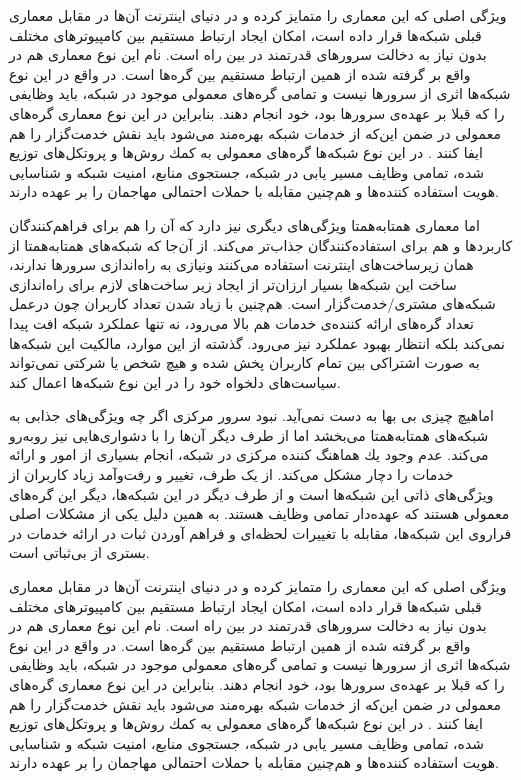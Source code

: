 \documentclass[12pt,twoside]{xepersian-magazine}
\begin{document}
\begin{article}{2}
ويژگی اصلی که اين معماری را متمايز کرده و در دنيای اينترنت آن‌ها در مقابل معماری قبلی شبكه‌ها قرار داده است، امكان ايجاد ارتباط مستقيم  بين كامپيوترهای مختلف بدون نياز به دخالت سرورهای قدرتمند در بين راه است.  نام‌ اين نوع معماری هم در واقع بر گرفته شده از همین  ارتباط مستقیم بين گره‌ها است.  در واقع در اين نوع شبكه‌ها اثری از سرورها نيست و تمامی گره‌های معمولی موجود در شبكه، بايد وظايفی را که قبلا بر عهده‌ی سرورها بود، خود انجام دهند. بنابراين در اين نوع معماری گره‌های معمولی در ضمن اين‌که از خدمات شبکه بهره‌مند می‌شود بايد نقش خدمت‌گزار را هم ايفا کنند . در اين نوع شبکه‌ها گره‌های معمولی به كمك روش‌ها و پروتكل‌های توزيع شده، تمامی وظايف  مسير يابی در شبكه، جستجوی منابع، امنيت شبكه و شناسايی هويت استفاده كننده‌ها و هم‌چنين مقابله با حملات احتمالی مهاجمان را بر عهده دارند.

اما معماری همتابه‌همتا ويژگی‌های ديگری نيز دارد که آن را هم برای فراهم‌کنندگان کاربردها و هم برای استفاده‌کنندگان جذاب‌تر می‌کند.  از آن‌جا که شبکه‌های همتابه‌همتا از همان زيرساخت‌های اينترنت استفاده می‌کنند ونيازی به راه‌اندازی سرورها ندارند، ساخت اين شبكه‌ها بسيار ارزان‌تر از ايجاد زير ساخت‌های لازم برای راه‌اندازی شبكه‌های مشتری/خدمت‌گزار است.  هم‌چنين با زياد شدن تعداد کاربران چون درعمل تعداد گره‌های ارائه کننده‌ی خدمات هم بالا می‌رود، نه تنها عملكرد شبكه افت پيدا نمی‌كند بلكه انتظار بهبود عملکرد نيز می‌رود. گذشته از اين موارد، مالكيت اين شبكه‌ها به صورت اشتراكی بين تمام کاربران پخش شده و هيچ شخص يا شركتی نمی‌تواند سياست‌های دلخواه خود را در اين نوع شبكه‌ها اعمال کند.

اماهيچ چيزی بی‌ بها به دست نمی‌آید. نبود سرور مرکزی اگر چه  ويژگی‌های جذابی به شبکه‌های همتابه‌همتا می‌بخشد اما از طرف ديگر آن‌ها را با دشواری‌هايی نيز روبه‌رو می‌کند.  عدم وجود يك هماهنگ كننده مركزی در شبكه، انجام بسياری از امور و ارائه خدمات را  دچار مشكل می‌کند.  از يک طرف، تغيير و رفت‌وآمد زیاد کاربران از ويژگی‌های ذاتی اين شبکه‌ها است و از طرف ديگر در اين شبكه‌ها، ديگر اين گره‌های معمولی  هستند كه  عهده‌دار تمامی وظايف هستند. به همين دلیل يکی از مشکلات اصلی فراروی اين شبكه‌ها، مقابله با  تغييرات لحظه‌ای و فراهم آوردن ثبات در ارائه  خدمات در بستری از بی‌ثباتی است.  


ويژگی اصلی که اين معماری را متمايز کرده و در دنيای اينترنت آن‌ها در مقابل معماری قبلی شبكه‌ها قرار داده است، امكان ايجاد ارتباط مستقيم  بين كامپيوترهای مختلف بدون نياز به دخالت سرورهای قدرتمند در بين راه است.  نام‌ اين نوع معماری هم در واقع بر گرفته شده از همین  ارتباط مستقیم بين گره‌ها است.  در واقع در اين نوع شبكه‌ها اثری از سرورها نيست و تمامی گره‌های معمولی موجود در شبكه، بايد وظايفی را که قبلا بر عهده‌ی سرورها بود، خود انجام دهند. بنابراين در اين نوع معماری گره‌های معمولی در ضمن اين‌که از خدمات شبکه بهره‌مند می‌شود بايد نقش خدمت‌گزار را هم ايفا کنند . در اين نوع شبکه‌ها گره‌های معمولی به كمك روش‌ها و پروتكل‌های توزيع شده، تمامی وظايف  مسير يابی در شبكه، جستجوی منابع، امنيت شبكه و شناسايی هويت استفاده كننده‌ها و هم‌چنين مقابله با حملات احتمالی مهاجمان را بر عهده دارند.


\end{article}
\end{document}
